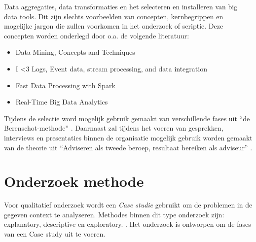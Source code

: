 Data aggregaties, data transformaties en het selecteren en installeren van big data tools. Dit zijn slechts voorbeelden van concepten, kernbegrippen en mogelijke jargon die zullen voorkomen in het onderzoek of scriptie. Deze concepten worden onderlegd door o.a. de volgende literatuur:

\begin{itemize}
    \item Data Mining, Concepts and Techniques \parencite{data-mining}
    \item I <3 Logs, Event data, stream processing, and data integration \parencite{logs}
    \item Fast Data Processing with Spark \parencite{spark}
    \item Real-Time Big Data Analytics \parencite{realtime-architectures}
\end{itemize}

Tijdens de selectie word mogelijk gebruik gemaakt van verschillende fases uit “de Berenschot-methode” \parencite{cuppen}.
Daarnaast zal tijdens het voeren van gesprekken, interviews en presentaties binnen de organisatie mogelijk gebruik worden gemaakt van de theorie uit “Adviseren als tweede beroep, resultaat bereiken als adviseur” \parencite{adviseren}.

\newpage

\section{Onderzoek methode} %


Voor qualitatief onderzoek wordt een \textit{Case studie} gebruikt om de problemen in de gegeven context te analyseren. Methodes binnen dit type onderzoek zijn: explanatory, descriptive en exploratory. \parencite{john-dudovskiy}. Het onderzoek is ontworpen om de fases van een Case study uit te voeren.

